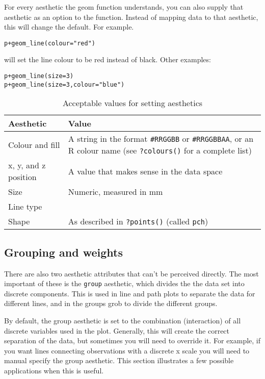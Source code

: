 For every aesthetic the geom function understands, you can also supply that aesthetic as an option to the function.  Instead of mapping data to that aesthetic, this will change the default.  For example.

\begin{alltt}
p + geom_line(colour="red")  
\end{alltt}

\noindent will set the line colour to be red instead of black.  Other examples:

\begin{alltt}
p + geom_line(size=3)  
p + geom_line(size=3, colour="blue")  
\end{alltt}

\begin{table}
  \begin{tabular}{lp{2in}}
    \toprule
    Aesthetic & Value \\
    \midrule
    Colour and fill & A string in the format {\tt \#RRGGBB} or {\tt \#RRGGBBAA}, or an R colour name (see {\tt ?colours()} for a complete list) \\
    x, y, and z position & A value that makes sense in the data space \\ 
    Size & Numeric, measured in mm\\
    Line type &  \\
    Shape & As described in {\tt ?points()} (called {\tt pch}) \\
    \bottomrule
  \end{tabular}
  \caption{Acceptable values for setting aesthetics}
  \label{label}
\end{table}


\subsection{Grouping and weights}
\label{sub:grouping}

There are also two aesthetic attributes that can't be perceived directly.  The most important of these is the {\tt group} aesthetic, which divides the the data set into discrete components.   This is used in line and path plots to separate the data for different lines, and in the groups grob to divide the different groups. 

By default, the group aesthetic is set to the combination (interaction) of all discrete variables used in the plot.  Generally, this will create the correct separation of the data, but sometimes you will need to override it.  For example, if you want lines connecting observations with a discrete x scale you will need to manual specify the group aesthetic.  This section illustrates a few possible applications when this is useful.

